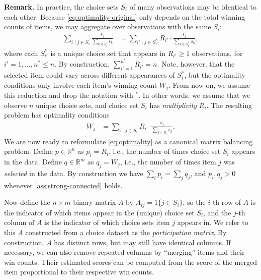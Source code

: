 \textbf{Remark.} In practice, the choice sets $S_i$ of many observations may be identical to each other. Because \eqref{eq:optimality-original} only depends on the total winning counts of items, we may aggregate over observations with the same $S_i$:
\begin{align*}
\sum_{i\mid j\in S_{i}}\frac{s_{j}}{\sum_{k\in S_{i}}s_{k}} & = \sum_{i'\mid j\in S^\ast_{i'}} R_{i'} \cdot \frac{s_{j}}{\sum_{k\in S^\ast_{i'}}s_{k}},
\end{align*}
where each $S_{i'}^\ast$ is a unique choice set that appears in $R_{i'}\geq 1$ observations, for $i'=1,\dots,n^\ast \leq n$. By construction, $\sum_{i'=1}^{n^\ast}R_{i'} =n$. Note, however, that the selected item could vary across different appearances of $S_i^\ast$, but the optimality conditions only involve each item's winning count $W_j$. From now on, we assume this reduction and drop the notation with $^\ast$. In other words, we assume that we observe $n$ unique choice sets, and choice set $S_i$ has \emph{multiplicity} $R_i$. The resulting problem has optimality conditions
\begin{align}
\label{eq:optimality}
{W_j} & = \sum_{i\mid j\in S_{i}}{R_i} \cdot \frac{s_{j}}{\sum_{k\in S_{i}}s_{k}}.
\end{align}
We are now ready to reformulate \eqref{eq:optimality} as a canonical matrix balancing problem. Define $p\in\mathbb{R}^{n}$ as $p_i=R_i$, i.e., the number of times choice set $S_i$ appears in the data. Define
$q\in\mathbb{R}^{m}$ as $q_j={W_j}$,
i.e., the number of times item $j$ was \emph{selected} in the data. By construction we have $\sum_i p_i=\sum_j q_j$, and $p_i,q_j>0$ whenever \cref{ass:strong-connected} holds.

Now define the $n\times m$ binary matrix $A$ by
$A_{ij}=1\{j\in S_{i}\}$, so the $i$-th row of $A$
is the indicator of which items appear in the (unique) choice set $S_i$, and the $j$-th column of $A$ is the indicator of which choice sets
item $j$ appears in. We refer to this $A$ constructed from a choice dataset as the \emph{participation matrix}. By construction, $A$ has distinct rows, but may still have identical columns. If necessary, we can also remove repeated columns by ``merging'' items and their win counts. Their estimated scores can be computed from the score of the merged item proportional to their respective win counts.


